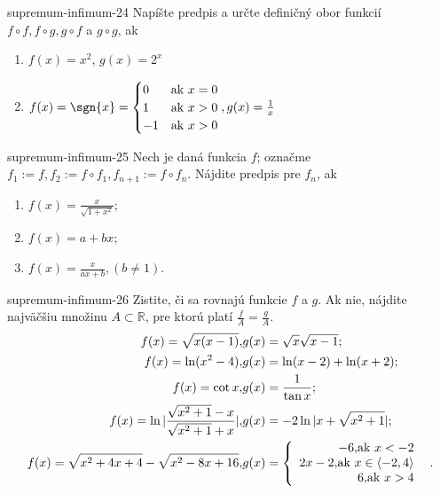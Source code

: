 \begin{defproblem}{supremum-infimum-24}
Napíšte predpis a určte definičný obor funkcií $f \circ f,f \circ g,g \circ f$
a $g \circ g$, ak
\begin{enumerate}
    \item $f(x) = x^2$, $g(x) = 2^x$
    \item $f(x) = \sgn{x} =
        \begin{cases}
            0  & \text{ak } x = 0 \\
            1  & \text{ak } x > 0 \\
            -1 & \text{ak } x > 0
        \end{cases}
        , \hfill g(x)=\frac{1}{x}$
\end{enumerate}
\end{defproblem}

\begin{defproblem}{supremum-infimum-25}
Nech je daná funkcia $f$; označme $f_1:=f,f_2:=f\circ f_1,f_{n+1}:=f\circ f_n$. Nájdite predpis pre $f_n$, ak
\begin{enumerate}
\item $f(x)=\frac{x}{\sqrt{1+x^2}}$;
\item $f(x)=a+bx$;
\item $f(x)=\frac{x}{ax+b},(b\neq 1)$.
\end{enumerate}
\end{defproblem}

\begin{defproblem}{supremum-infimum-26}
Zistite, či sa rovnajú funkcie $f$ a $g$. Ak nie, nájdite najväčšiu množinu $A\subset\mathbb{R}$, pre ktorú platí $\frac{f}{A}=\frac{g}{A}$.
\begin{align*}
f(x)=\sqrt{x(x-1)}, & g(x)=\sqrt{x}\sqrt{x-1};\\
f(x)=\ln (x^2-4), & g(x)=\ln (x-2)+\ln (x+2);\\
f(x)=\cot x, & g(x)=\frac{1}{\tan x};\\
f(x)=\ln |\frac{\sqrt{x^2+1}-x}{\sqrt{x^2+1}+x}|, & g(x)=-2\ln |x+\sqrt{x^2+1}|;\\
f(x)=\sqrt{x^2+4x+4}-\sqrt{x^2-8x+16}, & g(x)= \left\{ \begin{array}{r@{\quad}c}
    -6, $ak $ x<-2 \\
    2x-2, $ak $ x\in\langle -2,4 \rangle \\
   6, $ak $ x>4 \\ \end{array} \right. .
\end{align*}
\end{defproblem}

